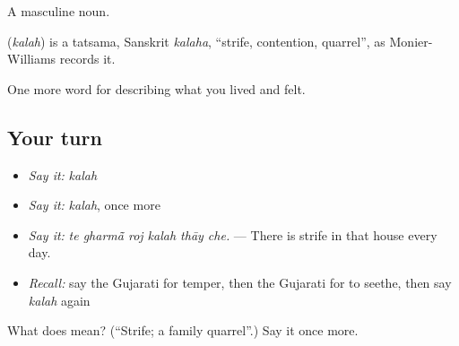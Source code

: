 A masculine noun.

\begin{cousinweb}
\textbf{} (\emph{kalah}) is a tatsama, Sanskrit \emph{kalaha}, \textquotedblleft{}strife, contention, quarrel\textquotedblright{}, as Monier-Williams records it.
\end{cousinweb}

\begin{grammarlens}[title={What you've built}]
One more word for describing what you lived and felt.
\end{grammarlens}

\subsection*{Your turn}
\begin{itemize}
\raggedright
  \item \emph{Say it:} \emph{kalah}
  \item \emph{Say it:} \emph{kalah}, once more
  \item \emph{Say it:} \emph{te gharmā̃ roj kalah thāy che.} — There is strife in that house every day.
  \item \emph{Recall:} say the Gujarati for temper, then the Gujarati for to seethe, then say \emph{kalah} again
\end{itemize}

\begin{tcolorbox}[breakable,colback=teal!4,colframe=teal!35!black,title={Before you move on}]
What does  mean? (\textquotedblleft{}Strife; a family quarrel\textquotedblright{}.) Say it once more.
\end{tcolorbox}
